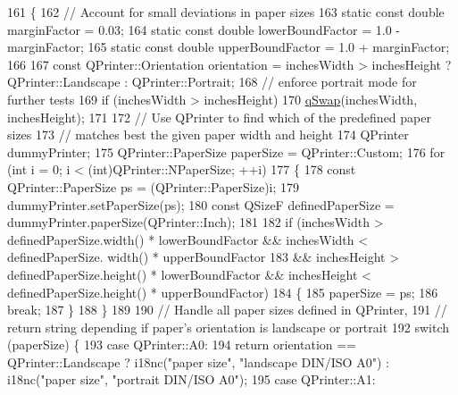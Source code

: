 \begin{DoxyCode}
161 \{
162     \textcolor{comment}{// Account for small deviations in paper sizes}
163     \textcolor{keyword}{static} \textcolor{keyword}{const} \textcolor{keywordtype}{double} marginFactor = 0.03;
164     \textcolor{keyword}{static} \textcolor{keyword}{const} \textcolor{keywordtype}{double} lowerBoundFactor = 1.0 - marginFactor;
165     \textcolor{keyword}{static} \textcolor{keyword}{const} \textcolor{keywordtype}{double} upperBoundFactor = 1.0 + marginFactor;
166 
167     \textcolor{keyword}{const} QPrinter::Orientation orientation = inchesWidth > inchesHeight ? QPrinter::Landscape : 
      QPrinter::Portrait;
168     \textcolor{comment}{// enforce portrait mode for further tests}
169     \textcolor{keywordflow}{if} (inchesWidth > inchesHeight)
170         \hyperlink{htmlextension_8h_a6aa0d61b42274f15f4a693b0c7bea484}{qSwap}(inchesWidth, inchesHeight);
171 
172     \textcolor{comment}{// Use QPrinter to find which of the predefined paper sizes}
173     \textcolor{comment}{// matches best the given paper width and height}
174     QPrinter dummyPrinter;
175     QPrinter::PaperSize paperSize = QPrinter::Custom;
176     \textcolor{keywordflow}{for} (\textcolor{keywordtype}{int} i = 0; i < (int)QPrinter::NPaperSize; ++i)
177     \{
178         \textcolor{keyword}{const} QPrinter::PaperSize ps = (QPrinter::PaperSize)i;
179         dummyPrinter.setPaperSize(ps);
180         \textcolor{keyword}{const} QSizeF definedPaperSize = dummyPrinter.paperSize(QPrinter::Inch);
181 
182         \textcolor{keywordflow}{if} (inchesWidth > definedPaperSize.width() * lowerBoundFactor && inchesWidth < definedPaperSize.
      width() * upperBoundFactor
183             && inchesHeight > definedPaperSize.height() * lowerBoundFactor && inchesHeight < 
      definedPaperSize.height() * upperBoundFactor)
184         \{
185             paperSize = ps;
186             \textcolor{keywordflow}{break};
187         \}
188     \}
189 
190     \textcolor{comment}{// Handle all paper sizes defined in QPrinter,}
191     \textcolor{comment}{// return string depending if paper's orientation is landscape or portrait}
192     \textcolor{keywordflow}{switch} (paperSize) \{
193         \textcolor{keywordflow}{case} QPrinter::A0:
194             \textcolor{keywordflow}{return}  orientation == QPrinter::Landscape ? i18nc(\textcolor{stringliteral}{"paper size"}, \textcolor{stringliteral}{"landscape DIN/ISO A0"}) : 
      i18nc(\textcolor{stringliteral}{"paper size"}, \textcolor{stringliteral}{"portrait DIN/ISO A0"});
195         \textcolor{keywordflow}{case} QPrinter::A1:

\end{DoxyCode}

